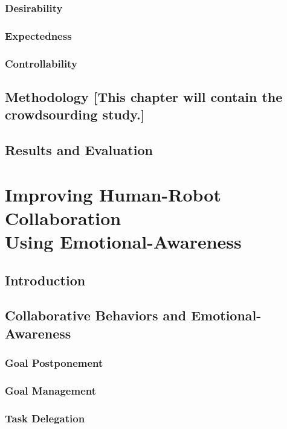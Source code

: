 \documentclass[12pt]{report}
\begin{document}
\subsection{Desirability}

\subsection{Expectedness}

\subsection{Controllability}

\section{Methodology [This chapter will contain the crowdsourding study.]}

\section{Results and Evaluation}

\chapter{Improving Human-Robot Collaboration \\ Using Emotional-Awareness}
\label{ch:awareness}

\section{Introduction}

\section{Collaborative Behaviors and Emotional-Awareness}

\subsection{Goal Postponement}

\subsection{Goal Management}

\subsection{Task Delegation}
\end{document}
